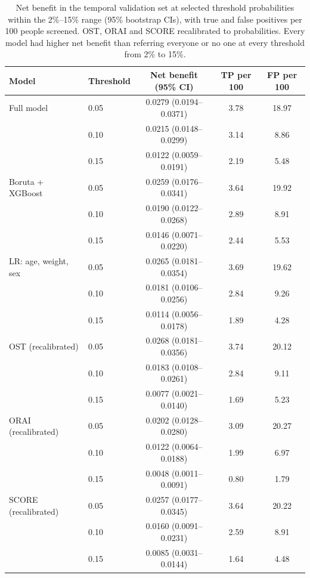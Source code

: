 \documentclass[11pt,a4paper]{article}
\begin{document}
\begin{table}[H]
\centering
\caption{Net benefit in the temporal validation set at selected threshold probabilities within the 2\%--15\% range (95\% bootstrap CIs), with true and false positives per 100 people screened. OST, ORAI and SCORE recalibrated to probabilities. Every model had higher net benefit than referring everyone or no one at every threshold from 2\% to 15\%.}
\label{tab:nb}
\small
\begin{tabular}{llccc}
\toprule
Model & Threshold & Net benefit (95\% CI) & TP per 100 & FP per 100 \\
\midrule
Full model & 0.05 & 0.0279 (0.0194--0.0371) & 3.78 & 18.97 \\
 & 0.10 & 0.0215 (0.0148--0.0299) & 3.14 & 8.86 \\
 & 0.15 & 0.0122 (0.0059--0.0191) & 2.19 & 5.48 \\
\addlinespace
Boruta + XGBoost & 0.05 & 0.0259 (0.0176--0.0341) & 3.64 & 19.92 \\
 & 0.10 & 0.0190 (0.0122--0.0268) & 2.89 & 8.91 \\
 & 0.15 & 0.0146 (0.0071--0.0220) & 2.44 & 5.53 \\
\addlinespace
LR: age, weight, sex & 0.05 & 0.0265 (0.0181--0.0354) & 3.69 & 19.62 \\
 & 0.10 & 0.0181 (0.0106--0.0256) & 2.84 & 9.26 \\
 & 0.15 & 0.0114 (0.0056--0.0178) & 1.89 & 4.28 \\
\addlinespace
OST (recalibrated) & 0.05 & 0.0268 (0.0181--0.0356) & 3.74 & 20.12 \\
 & 0.10 & 0.0183 (0.0108--0.0261) & 2.84 & 9.11 \\
 & 0.15 & 0.0077 (0.0021--0.0140) & 1.69 & 5.23 \\
\addlinespace
ORAI (recalibrated) & 0.05 & 0.0202 (0.0128--0.0280) & 3.09 & 20.27 \\
 & 0.10 & 0.0122 (0.0064--0.0188) & 1.99 & 6.97 \\
 & 0.15 & 0.0048 (0.0011--0.0091) & 0.80 & 1.79 \\
\addlinespace
SCORE (recalibrated) & 0.05 & 0.0257 (0.0177--0.0345) & 3.64 & 20.22 \\
 & 0.10 & 0.0160 (0.0091--0.0231) & 2.59 & 8.91 \\
 & 0.15 & 0.0085 (0.0031--0.0144) & 1.64 & 4.48 \\
\bottomrule
\end{tabular}
\end{table}
\end{document}
